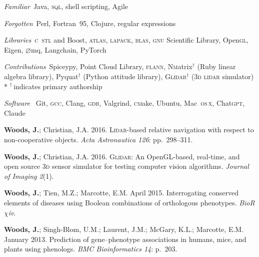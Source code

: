 \documentclass[12pt,letterpaper]{article}
\newcommand{\Cpp}{\textsc{c}\nolinebreak[4]\hspace{-.05em}\raisebox{.4ex}{\relsize{-3}{\textbf{++}}}}
\newcommand{\Magickpp}{Magick\nolinebreak[4]\hspace{-.05em}\raisebox{.4ex}{\relsize{-3}{\textbf{++}}}}
\newcommand{\mhead}[1]{\leavevmode\marginpar{\sffamily\footnotesize #1}}
\begin{document}
\medskip
\emph{Familiar}\ 
Java, \textsc{sql}, shell scripting, Agile

\medskip
\emph{Forgotten}\
Perl, Fortran~95, Clojure, regular expressions

\medskip
\emph{Libraries}\ 
\Cpp\ \textsc{stl} and Boost,
\textsc{atlas},
\textsc{lapack},
\textsc{blas},
\textsc{gnu} Scientific Library,
Open\textsc{gl},
Eigen,
$\varnothing$mq,
Langchain,
PyTorch

\medskip
\emph{Contributions}\ 
Spiceypy, %
Point Cloud Library, %
\textsc{flann}, %
\textsc{Nm}atrix$^\dagger$ (Ruby linear algebra library),
Pyquat$^\dagger$ (Python attitude library),
\textsc{Glidar}$^\dagger$ (\textsc{3d lidar} simulator)
\\*
\medskip
$^\dagger$\,{\footnotesize indicates primary authorship}

\medskip
\emph{Software}\
Git,
\textsc{gcc},
Clang,
\textsc{gdb},
Valgrind,
\textsc{cm}ake,
Ubuntu,
Mac~\textsc{os\,x},
Chat\textsc{gpt},
Claude

\bigskip
\mhead{Articles}%
\par\vspace{-\baselineskip}%
\par\textbf{Woods, J.}; Christian, J.A. 2016. \textsc{Lidar}-based relative navigation with respect to non-cooperative objects. \textit{Acta Astronautica 126}: pp.\ 298--311.

\medskip
\par\textbf{Woods, J.}; Christian, J.A. 2016. \textsc{Glidar}: An OpenGL-based, real-time, and open source 3\textsc{d} sensor simulator for testing computer vision algorithms. \textit{Journal of Imaging 2}(1).

\medskip
\par\textbf{Woods, J.}; Tien, M.Z.; Marcotte, E.M. April 2015. Interrogating conserved elements of diseases using Boolean combinations of orthologous phenotypes. \textit{BioR$\chi$iv}.

\medskip
\par\textbf{Woods, J.}; Singh-Blom, U.M.; Laurent, J.M.; McGary, K.L.; Marcotte, E.M. January 2013. Prediction of gene--phenotype associations in humans, mice, and plants using phenologs. \textit{BMC Bioinformatics 14}: p.\ 203.
\end{document}
